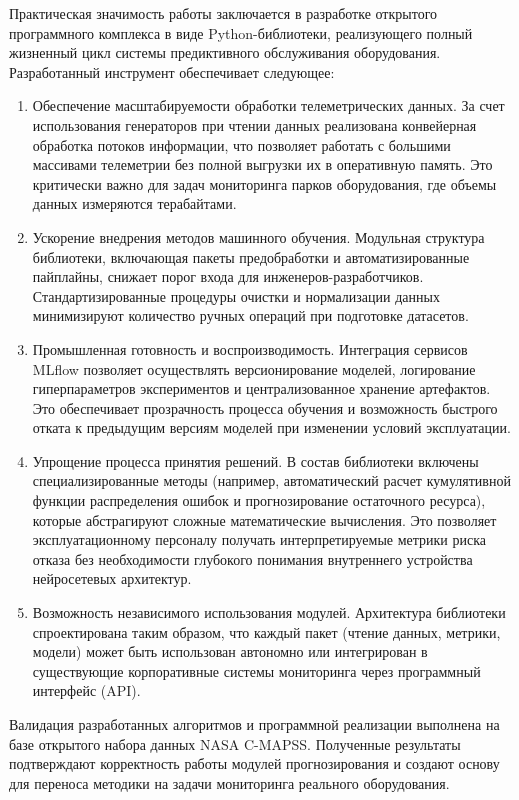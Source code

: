 \documentclass[14pt, a4paper, oneside]{extreport}
\begin{document}
Практическая значимость работы заключается в разработке открытого программного комплекса в виде Python-библиотеки, реализующего полный жизненный цикл системы предиктивного обслуживания оборудования. Разработанный инструмент обеспечивает следующее:
\begin{enumerate}
    \item Обеспечение масштабируемости обработки телеметрических данных. За счет использования генераторов при чтении данных реализована конвейерная обработка потоков информации, что позволяет работать с большими массивами телеметрии без полной выгрузки их в оперативную память. Это критически важно для задач мониторинга парков оборудования, где объемы данных измеряются терабайтами.
    \item Ускорение внедрения методов машинного обучения. Модульная структура библиотеки, включающая пакеты предобработки и автоматизированные пайплайны, снижает порог входа для инженеров-разработчиков. Стандартизированные процедуры очистки и нормализации данных минимизируют количество ручных операций при подготовке датасетов.
    \item Промышленная готовность и воспроизводимость. Интеграция сервисов MLflow позволяет осуществлять версионирование моделей, логирование гиперпараметров экспериментов и централизованное хранение артефактов. Это обеспечивает прозрачность процесса обучения и возможность быстрого отката к предыдущим версиям моделей при изменении условий эксплуатации.
    \item Упрощение процесса принятия решений. В состав библиотеки включены специализированные методы (например, автоматический расчет кумулятивной функции распределения ошибок и прогнозирование остаточного ресурса), которые абстрагируют сложные математические вычисления. Это позволяет эксплуатационному персоналу получать интерпретируемые метрики риска отказа без необходимости глубокого понимания внутреннего устройства нейросетевых архитектур.
    \item Возможность независимого использования модулей. Архитектура библиотеки спроектирована таким образом, что каждый пакет (чтение данных, метрики, модели) может быть использован автономно или интегрирован в существующие корпоративные системы мониторинга через программный интерфейс (API).
\end{enumerate}
Валидация разработанных алгоритмов и программной реализации выполнена на базе открытого набора данных NASA C-MAPSS. Полученные результаты подтверждают корректность работы модулей прогнозирования и создают основу для переноса методики на задачи мониторинга реального оборудования.
\end{document}
